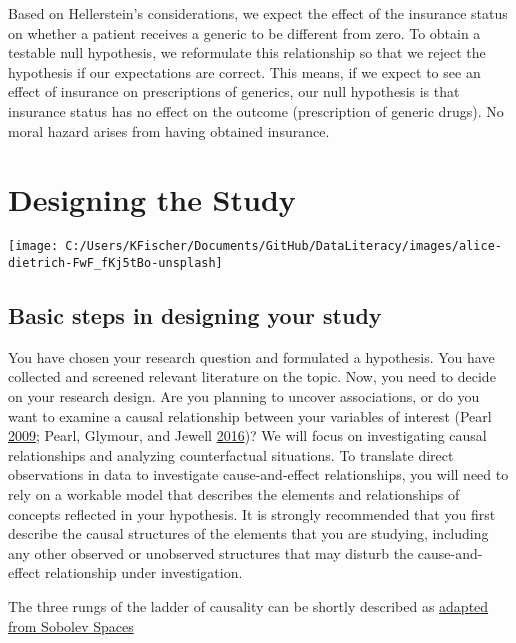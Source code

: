 \documentclass[
]{book}
\begin{document}
Based on Hellerstein's considerations, we expect the effect of the
insurance status on whether a patient receives a generic to be different
from zero. To obtain a testable null hypothesis, we reformulate this
relationship so that we reject the hypothesis if our expectations are
correct. This means, if we expect to see an effect of insurance on
prescriptions of generics, our null hypothesis is that insurance status
has no effect on the outcome (prescription of generic drugs). No moral
hazard arises from having obtained insurance.

\hypertarget{designstudy}{%
\chapter{Designing the Study}\label{designstudy}}

\begin{center}\texttt{[image: C:/Users/KFischer/Documents/GitHub/DataLiteracy/images/alice-dietrich-FwF\_fKj5tBo-unsplash]} \end{center}

\hypertarget{basic-steps-in-designing-your-study}{%
\section{Basic steps in designing your
study}\label{basic-steps-in-designing-your-study}}

You have chosen your research question and formulated a hypothesis. You
have collected and screened relevant literature on the topic. Now, you
need to decide on your research design. Are you planning to uncover
associations, or do you want to examine a causal relationship between
your variables of interest (Pearl
\protect\hyperlink{ref-pearl_causality_2009}{2009}; Pearl, Glymour, and
Jewell \protect\hyperlink{ref-pearl_causal_2016}{2016})? We will focus
on investigating causal relationships and analyzing counterfactual
situations. To translate direct observations in data to investigate
cause-and-effect relationships, you will need to rely on a workable
model that describes the elements and relationships of concepts
reflected in your hypothesis. It is strongly recommended that you first
describe the causal structures of the elements that you are studying,
including any other observed or unobserved structures that may disturb
the cause-and-effect relationship under investigation.

The three rungs of the ladder of causality can be shortly described as
\href{https://sobolevspace.com/causality/f/queries-of-causal-epistemology?blogcategory=Causality}{adapted
from Sobolev Spaces}
\end{document}
